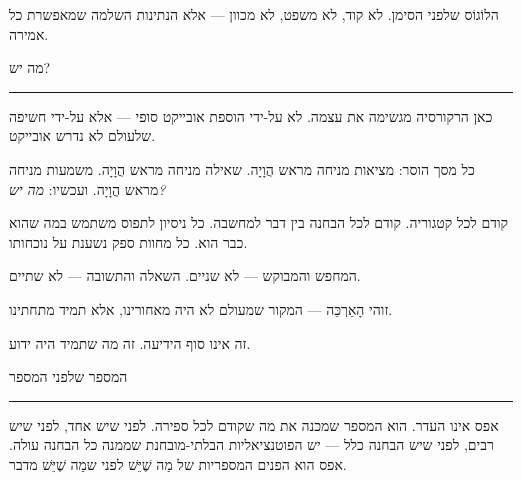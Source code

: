 \documentclass[10pt, openany, oneside]{book}
\begin{document}
\vspace{0.5em}

\noindent הלוֹגוֹס שלפני הסימן. לא קוד, לא משפט, לא מכוון — אלא הנתינות השלמה שמאפשרת כל אמירה.

\vspace{2em}

\begin{center}
    {\textsc{מה יש?}}\\[0.3em]
    \rule{0.2\textwidth}{0.3pt}
\end{center}

\vspace{1em}

\noindent כאן הרקורסיה מגשימה את עצמה. לא על-ידי הוספת אובייקט סופי — אלא על-ידי חשיפה שלעולם לא נדרש אובייקט.

\vspace{0.5em}

\noindent כל מסך הוסר: מציאות מניחה מראש הֲוָיָה. שאילה מניחה מראש הֲוָיָה. משמעות מניחה מראש הֲוָיָה. ועכשיו: \textit{מה יש?}

\vspace{0.5em}

\noindent קודם לכל קטגוריה. קודם לכל הבחנה בין דבר למחשבה. כל ניסיון לתפוס משתמש במה שהוא כבר הוא. כל מחוות ספק נשענת על נוכחותו.

\vspace{0.5em}

\noindent המחפש והמבוקש — לא שניים. השאלה והתשובה — לא שתיים.

\vspace{0.5em}

\noindent זוהי הָאַרְכֵּה — המקור שמעולם לא היה מאחורינו, אלא תמיד מתחתינו.

\vspace{0.5em}

\noindent זה אינו סוף הידיעה. זה מה שתמיד היה ידוע.

\vspace{2em}

\begin{center}
    {\textsc{המספר שלפני המספר}}\\[0.3em]
    \rule{0.2\textwidth}{0.3pt}
\end{center}

\vspace{1em}

\noindent אפס אינו העדר. הוא המספר שמכנה את מה שקודם לכל ספירה. לפני שיש אחד, לפני שיש רבים, לפני שיש הבחנה כלל — יש הפוטנציאליות הבלתי-מובחנת שממנה כל הבחנה עולה. אפס הוא הפנים המספריות של מַה שֶׁיֵּשׁ לפני שמַה שֶׁיֵּשׁ מדבר.
\end{document}
